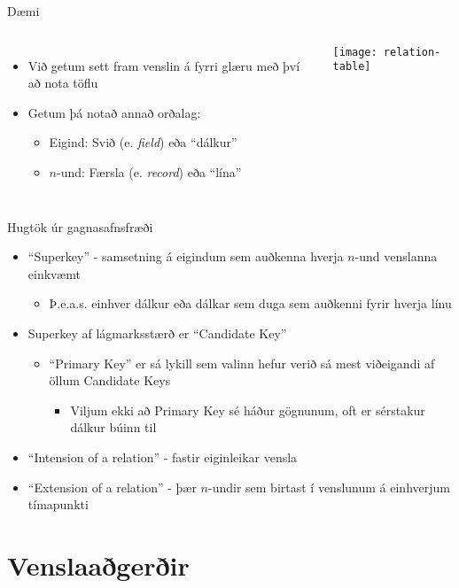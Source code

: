\documentclass{beamer}
\begin{document}
\begin{frame}[fragile]{Dæmi}
\begin{columns}
\begin{itemize}
 \item Við getum sett fram venslin á fyrri glæru með því að nota töflu
 \item Getum þá notað annað orðalag:
 \begin{itemize}
  \item Eigind: Svið (e. \emph{field}) eða ``dálkur''
  \item $n$-und: Færsla (e. \emph{record}) eða ``lína''
 \end{itemize}
\end{itemize}
\begin{center}
\texttt{[image: relation-table]}
\end{center}
\end{columns}
\end{frame}

\begin{frame}{Hugtök úr gagnasafnsfræði}
\begin{itemize}
 \item ``Superkey'' - samsetning á eigindum sem auðkenna hverja $n$-und venslanna einkvæmt
 \begin{itemize}
  \item Þ.e.a.s. einhver dálkur eða dálkar sem duga sem auðkenni fyrir hverja línu
 \end{itemize}
 \item Superkey af lágmarksstærð er ``Candidate Key''
 \begin{itemize}
  \item ``Primary Key'' er sá lykill sem valinn hefur verið sá mest viðeigandi af öllum Candidate Keys
  \begin{itemize}
   \item Viljum ekki að Primary Key sé háður gögnunum, oft er sérstakur dálkur búinn til
  \end{itemize}
 \end{itemize}
 \item ``Intension of a relation'' - fastir eiginleikar vensla
 \item ``Extension of a relation'' - þær $n$-undir sem birtast í venslunum á einhverjum tímapunkti
\end{itemize}
\end{frame}

\section{Venslaaðgerðir}
\end{document}
